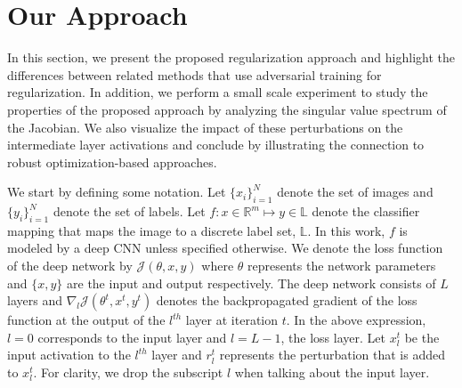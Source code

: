 \section{Our Approach}\label{sec:method}
In this section, we present the proposed regularization approach and highlight the  differences between related methods that use adversarial training for regularization. In addition, we perform a small scale experiment to study the properties of the proposed approach by analyzing the singular value spectrum of the Jacobian. We also visualize the impact of these perturbations on the intermediate layer activations and conclude by illustrating the connection to robust optimization-based approaches.

We start by defining some notation. Let $\{x_i\}_{i=1}^{N}$ denote the set of images and $\{y_i\}_{i=1}^{N}$ denote the set of labels. Let $f: x \in \mathbb{R}^{m} \mapsto y \in \mathbb{L}$ denote the classifier mapping that maps the image to a discrete label set, $\mathbb{L}$. In this work, $f$ is modeled by a deep CNN unless specified otherwise. We denote the loss function of the deep network by $\mathcal{J}(\theta,x,y)$ where $\theta$ represents the network parameters and $\{x,y\}$ are the input and output respectively. The deep network consists of $L$ layers and $\nabla_{l}\mathcal{J}(\theta^{t},x^{t},y^{t})$ denotes the backpropagated gradient of the loss function at the output of the ${l}^{th}$ layer at iteration $t$. In the above expression, $l=0$ corresponds to the input layer and $l=L-1$, the loss layer. Let $x^{t}_{l}$ be the input activation to the $l^{th}$ layer and $r^{t}_{l}$ represents the perturbation that is added to $x^{t}_{l}$. For clarity, we drop the subscript $l$ when talking about the input layer. %


